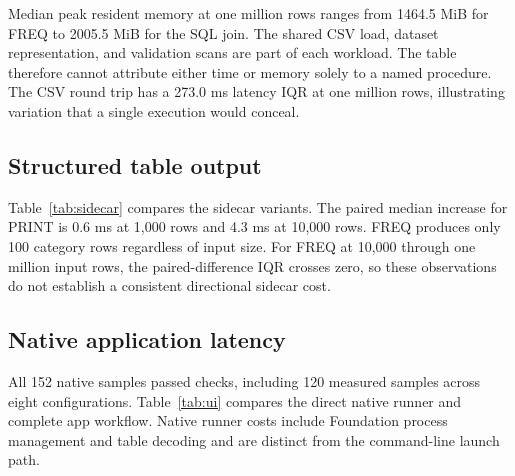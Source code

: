 \documentclass[11pt,a4paper]{article}
\begin{document}
Median peak resident memory at one million rows ranges from
1464.5 MiB for FREQ to 2005.5 MiB for the SQL join. The shared
CSV load, dataset representation, and validation scans are part
of each workload. The table therefore cannot attribute either
time or memory solely to a named procedure. The CSV round trip
has a 273.0 ms latency IQR at one million rows, illustrating
variation that a single execution would conceal.

\subsection{Structured table output}

Table~\ref{tab:sidecar} compares the sidecar variants. The paired
median increase for PRINT is 0.6 ms at 1,000 rows and 4.3 ms at
10,000 rows. FREQ produces only 100 category rows regardless of
input size. For FREQ at 10,000 through one million input rows,
the paired-difference IQR crosses zero, so these observations
do not establish a consistent directional sidecar cost.

\begin{table}[tbp]
\centering
\small

\caption{CLI table-output comparison in milliseconds. Values
are medians (IQR widths). The paired difference is sidecar minus
plain execution, matched by iteration. It can differ in sign
from the difference of marginal medians.}
\label{tab:sidecar}
\end{table}

\subsection{Native application latency}

All 152 native samples passed checks, including 120 measured
samples across eight configurations. Table~\ref{tab:ui} compares
the direct native runner and complete app workflow. Native runner
costs include Foundation process management and table decoding
and are distinct from the command-line launch path.

\begin{table}[tbp]
\centering
\small

\caption{Native runner and application latency in milliseconds:
medians (IQR widths), fifteen measured repetitions per cell.
The paired difference is application minus runner. App timing
ends after the first synchronous display pass, not physical
screen presentation.}
\label{tab:ui}
\end{table}
\end{document}
